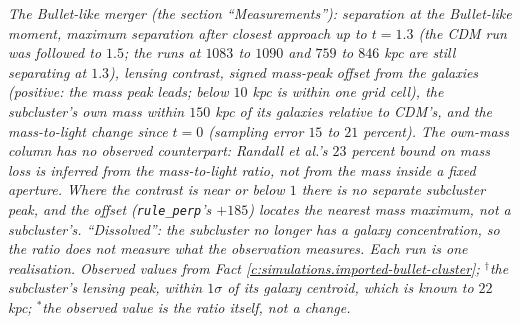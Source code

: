 \documentclass[11pt]{article}
\theoremstyle{definition}
\theoremstyle{plain}
\begin{document}
\emph{The Bullet-like merger (the section ``Measurements''): separation at the Bullet-like moment, maximum separation after closest approach up to $t = 1.3$ (the CDM run was followed to $1.5$; the runs at $1083$ to $1090$ and $759$ to $846$ kpc are still separating at $1.3$), lensing contrast, signed mass-peak offset from the galaxies (positive: the mass peak leads; below $10$ kpc is within one grid cell), the subcluster's own mass within $150$ kpc of its galaxies relative to CDM's, and the mass-to-light change since $t = 0$ (sampling error $15$ to $21$ percent). The own-mass column has no observed counterpart: Randall et al.'s $23$ percent bound on mass loss is inferred from the mass-to-light ratio, not from the mass inside a fixed aperture. Where the contrast is near or below $1$ there is no separate subcluster peak, and the offset (\texttt{rule\_perp}'s $+185$) locates the nearest mass maximum, not a subcluster's. ``Dissolved'': the subcluster no longer has a galaxy concentration, so the ratio does not measure what the observation measures. Each run is one realisation. Observed values from Fact \ref{c:simulations.imported-bullet-cluster}; $^{\dagger}$the subcluster's lensing peak, within $1\sigma$ of its galaxy centroid, which is known to $22$ kpc; $^{*}$the observed value is the ratio itself, not a change.}
\end{document}
